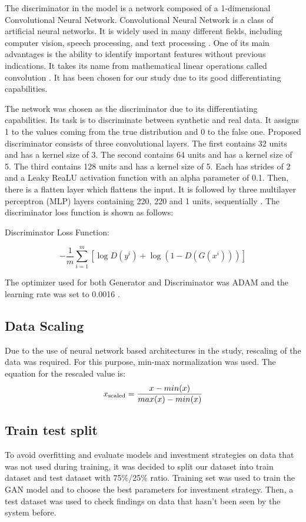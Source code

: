 \documentclass[11pt]{article} %
\begin{document}
The discriminator in the model is a network composed of a 1-dimensional Convolutional Neural Network. 
Convolutional Neural Network is a class of artificial neural networks. It is widely used in many different fields, including computer vision, speech processing, and text processing \cite{cnn1}. One of its main advantages is the ability to identify important features without previous indications. It takes its name from mathematical linear operations called convolution \cite{cnn2}. It has been chosen for our study due to its good differentiating capabilities.

The network was chosen as the discriminator due to its differentiating capabilities. Its task is to discriminate between synthetic and real data. It assigns 1 to the values coming from the true distribution and 0 to the false one. 
Proposed discriminator consists of three convolutional layers. The first contains 32 units and has a kernel size of 3. The second contains 64 units and has a kernel size of 5. The third contains 128 units and has a kernel size of 5. Each has strides of 2 and a Leaky ReaLU activation function with an alpha parameter of 0.1. Then, there is a flatten layer which flattens the input. It is followed by three multilayer perceptron (MLP) layers containing 220, 220 and 1 units, sequentially \cite{gan-stock}\cite{gan-stock2}. 
The discriminator loss function is shown as follows: 
\begin{center}  Discriminator Loss Function: \end{center}
\begin{equation}
-\frac{1}{m} \sum_{i=1}^{m}\left[\log D\left(y^{i}\right)+\log \left(1-D\left(G\left(x^{i}\right)\right)\right)\right]
\end{equation}

The optimizer used for both Generator and Discriminator was ADAM and the learning rate was set to 0.0016 \cite{s-gan}.

\subsection{Data Scaling}
Due to the use of neural network based architectures in the study, rescaling of the data was required. For this purpose, min-max normalization was used. The equation for the rescaled value is: 
\begin{equation} x\textsubscript{scaled} = \frac{x - min(x)}{max(x) - min(x)} \end{equation}

\subsection{Train test split}
To avoid overfitting and evaluate models and investment strategies on data that was not used during training, it was decided to split our dataset into train dataset and test dataset with 75\%/25\% ratio. Training set was used to train the GAN model and to choose the best parameters for investment strategy. Then, a test dataset was used to check findings on data that hasn't been seen by the system before.
\end{document}
